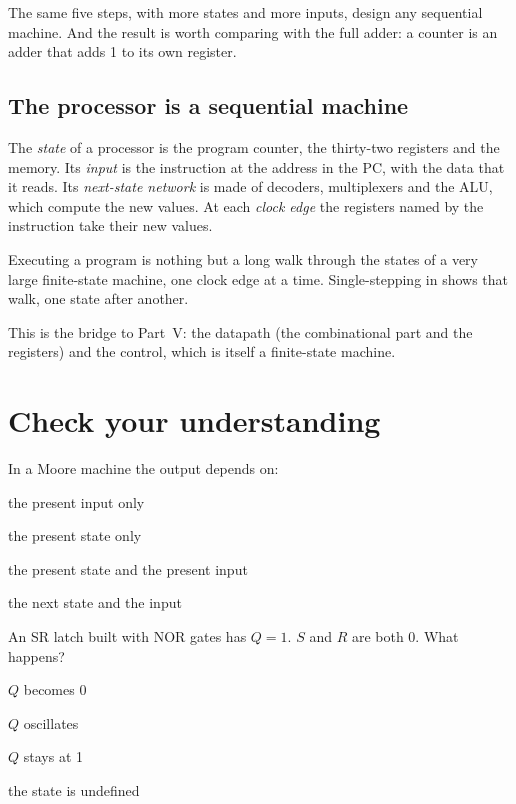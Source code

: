 The same five steps, with more states and more inputs, design any sequential
machine. And the result is worth comparing with the full adder: a counter is
an adder that adds 1 to its own register.

\subsection{The processor is a sequential machine}

\begin{prgmachine}
The \emph{state} of a processor is the program counter, the thirty-two
registers and the memory. Its \emph{input} is the instruction at the address
in the PC, with the data that it reads. Its \emph{next-state network} is made
of decoders, multiplexers and the ALU, which compute the new values. At each
\emph{clock edge} the registers named by the instruction take their new
values.

Executing a program is nothing but a long walk through the states of a very
large finite-state machine, one clock edge at a time. Single-stepping in
\prgqt shows that walk, one state after another.
\end{prgmachine}

This is the bridge to Part~V: the datapath (the combinational part and the
registers) and the control, which is itself a finite-state machine.





\section{Check your understanding}

\begin{quiz}{In a Moore machine the output depends on:}
\item the present input only
\item the present state only
\item the present state and the present input
\item the next state and the input
\end{quiz}

\begin{quiz}{An SR latch built with NOR gates has $Q=1$. $S$ and $R$ are both 0. What happens?}
\item $Q$ becomes 0
\item $Q$ oscillates
\item $Q$ stays at 1
\item the state is undefined
\end{quiz}

